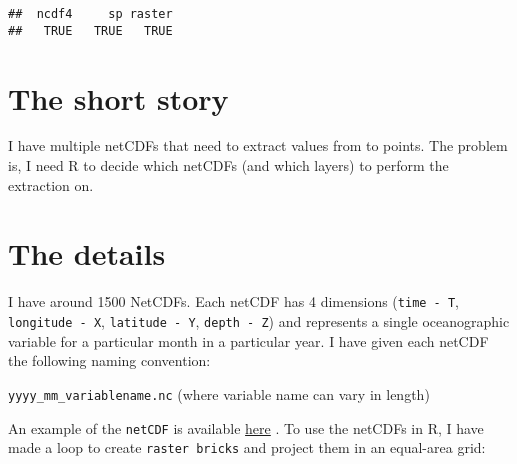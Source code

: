\documentclass[]{article}
\begin{document}
\begin{verbatim}
##  ncdf4     sp raster 
##   TRUE   TRUE   TRUE
\end{verbatim}

\section{The short story}\label{the-short-story}

I have multiple netCDFs that need to extract values from to points. The
problem is, I need R to decide which netCDFs (and which layers) to
perform the extraction on.

\section{The details}\label{the-details}

I have around 1500 NetCDFs. Each netCDF has 4 dimensions
(\texttt{time\ -\ T}, \texttt{longitude\ -\ X}, \texttt{latitude\ -\ Y},
\texttt{depth\ -\ Z}) and represents a single oceanographic variable for
a particular month in a particular year. I have given each netCDF the
following naming convention:

\texttt{yyyy\_mm\_variablename.nc} (where variable name can vary in
length)

An example of the \texttt{netCDF} is available
\href{https://drive.google.com/file/d/1y2XU5RzUBRLgTXkql667a5o_PVk5LMTP/view?usp=sharing}{here}
. To use the netCDFs in R, I have made a loop to create
\texttt{raster\ bricks} and project them in an equal-area grid:
\end{document}
